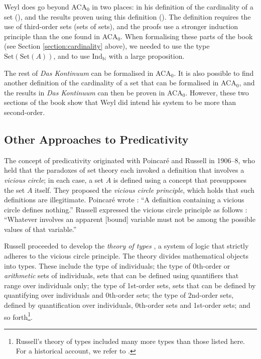 \documentclass[acmtocl]{acmtrans2m}
\newcommand{\Set}[1]{\mathrm{Set} \left( {#1} \right)}
\newcommand{\IN}{\mathrm{Ind}_\mathbb{N}}
\begin{document}
Weyl does go beyond ACA$_0$ in two places: in his definition of the cardinality of a set (\cite[Chapter 1 \S 7, pp. 38--39]{weyl:continuum}), and the results proven using this definition (\cite[Chapter 2 \S 1, pp.55f]{weyl:continuum}).  The definition requires the use of third-order sets (sets of sets), and the proofs use a stronger induction principle than the one found in ACA$_0$.  When formalising these parts of the book (see Section \ref{section:cardinality} above), we needed to use the type $\Set{\Set{A}}$, and to use $\IN$ with a large proposition.

\pagebreak

The rest of \emph{Das Kontinuum} can be formalised in ACA$_0$.  It is also possible to find another definition of the cardinality of a set that can be formalised in ACA$_0$, and the results in \emph{Das Kontinuum} can then be proven in ACA$_0$.  However, these two sections of the book show that Weyl did intend his system to be more than second-order.

\subsection{Other Approaches to Predicativity}




The concept of predicativity originated with Poincar\'e and Russell in 1906--8, who
held that the paradoxes of set theory each invoked a definition that involves a \emph{vicious circle}; in each case, a set $A$ is defined using a concept that presupposes the set $A$ itself.  They proposed the \emph{vicious circle principle}, which holds that such definitions are illegitimate.  Poincar\'e wrote \cite{poincare:ml3}: ``A definition containing a vicious circle defines nothing.''  Russell expressed the vicious circle principle as follows \cite{russell:pl}: ``Whatever involves an apparent [bound] variable must not be among the possible values of that variable.''

Russell proceeded to develop the \emph{theory of types} \cite{russell:mlbtt}, a system of logic that strictly adheres to the vicious circle principle.  The theory divides mathematical objects into types.  These include the type of individuals; the type of 0th-order or \emph{arithmetic} sets of individuals, sets that can be defined using quantifiers that range over individuals only; the type of 1st-order sets, sets that can be defined by quantifying over individuals and 0th-order sets; the type of 2nd-order sets, defined by quantification over individuals, 0th-order sets and 1st-order sets; and so forth\footnote{Russell's theory of types included many more types than those listed here.  For a historical account, we refer to \cite{kln:tlm1940}.}.
\end{document}
